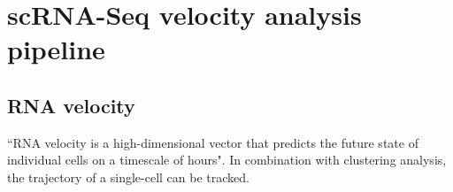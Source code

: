 \section{scRNA-Seq velocity analysis pipeline}

\subsection{RNA velocity}
``RNA velocity is a high-dimensional vector that predicts the future state of individual cells on a timescale of hours"\cite{la2018rna}.
In combination with clustering analysis, the trajectory of a single-cell can be tracked.


